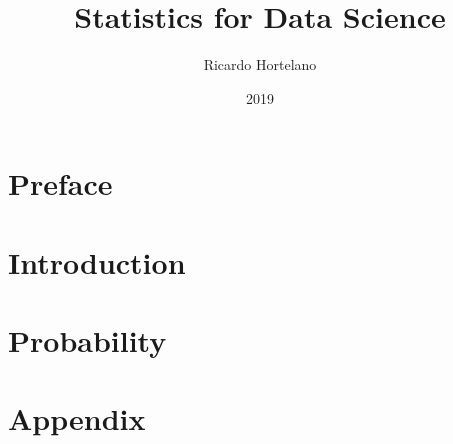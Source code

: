 \documentclass[12pt]{book}
\title{
{Statistics for Data Science}\\
}
\author{Ricardo Hortelano}
\date{2019}
\begin{document}
\maketitle
\tableofcontents

\chapter*{Preface}


\chapter{Introduction}


\chapter{Probability}


\appendix
\chapter{Appendix}


\printbibliography
\end{document}
